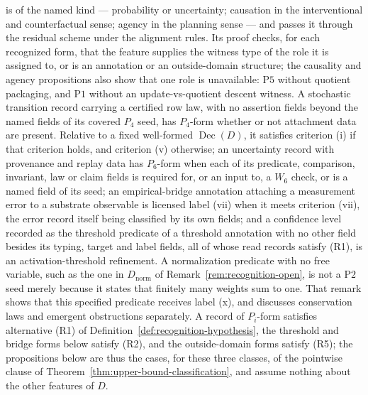 \documentclass[11pt]{article}
\theoremstyle{definition}
\newcommand{\Dec}[1]{\ensuremath{\operatorname{Dec}\!\left(#1\right)}}
\newcommand{\Pone}{\ensuremath{\mathrm{P1}}}
\newcommand{\Ptwo}{\ensuremath{\mathrm{P2}}}
\newcommand{\Pfive}{\ensuremath{\mathrm{P5}}}
\begin{document}
is of the named kind --- probability or uncertainty; causation in the
interventional and counterfactual sense; agency in the planning sense --- and
passes it through the residual scheme under the alignment rules. Its proof
checks, for each recognized form, that the feature supplies the witness type
of the role it is assigned to, or is an annotation or an outside-domain
structure; the causality and agency propositions also show that one role is
unavailable: \Pfive{} without quotient packaging, and \Pone{} without an
update-vs-quotient descent witness. A stochastic transition record carrying a certified row law, with no assertion
fields beyond the named fields of its covered \(P_4\) seed, has \(P_4\)-form
whether or not attachment data are present. Relative to a fixed well-formed
\(\Dec{D}\), it satisfies criterion (i) if that criterion holds, and criterion
(v) otherwise; an uncertainty record with provenance and replay data
has \(P_6\)-form when each of its predicate, comparison, invariant, law or claim
fields is required for, or an input to, a \(W_6\) check, or is a named field of
its seed; an empirical-bridge annotation attaching a measurement error to a substrate observable is licensed label (vii) when it meets criterion (vii), the error record itself being classified by its own fields; and a
confidence level recorded as the threshold predicate of a threshold annotation
with no other field besides its typing, target and label fields, all of whose
read records satisfy (R1), is an activation-threshold refinement. A normalization predicate with no free variable, such as the
one in \(D_{\mathrm{norm}}\) of Remark~\ref{rem:recognition-open}, is not a
\Ptwo{} seed merely because it states that finitely many weights sum to
one. That remark shows that this
specified predicate receives label (x), and discusses conservation laws and
emergent obstructions separately.
A record of \(P_i\)-form satisfies alternative (R1) of
Definition~\ref{def:recognition-hypothesis}, the threshold and bridge forms below
satisfy (R2), and the outside-domain forms satisfy (R5); the propositions below
are thus the cases, for these three classes, of the pointwise clause of
Theorem~\ref{thm:upper-bound-classification}, and assume nothing about the other
features of \(D\).
\end{document}
